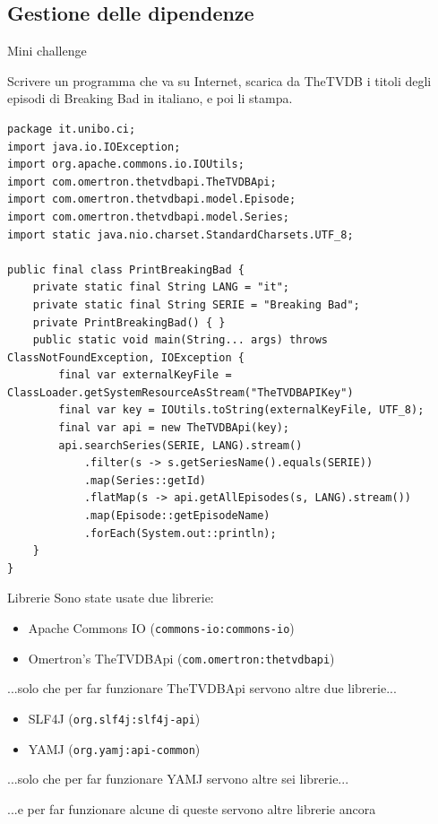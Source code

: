 \documentclass[presentation]{beamer}
\begin{document}
\subsection{Gestione delle dipendenze}

\begin{frame}[fragile]{Mini challenge}
\begin{block}{}
Scrivere un programma che va su Internet, scarica da TheTVDB i titoli degli episodi di Breaking Bad in italiano, e poi li stampa.
\end{block}

\pause
\begin{verbatim}
package it.unibo.ci;
import java.io.IOException;
import org.apache.commons.io.IOUtils;
import com.omertron.thetvdbapi.TheTVDBApi;
import com.omertron.thetvdbapi.model.Episode;
import com.omertron.thetvdbapi.model.Series;
import static java.nio.charset.StandardCharsets.UTF_8;

public final class PrintBreakingBad {
    private static final String LANG = "it";
    private static final String SERIE = "Breaking Bad";
    private PrintBreakingBad() { }
    public static void main(String... args) throws ClassNotFoundException, IOException {
        final var externalKeyFile = ClassLoader.getSystemResourceAsStream("TheTVDBAPIKey")
        final var key = IOUtils.toString(externalKeyFile, UTF_8);
        final var api = new TheTVDBApi(key);
        api.searchSeries(SERIE, LANG).stream()
            .filter(s -> s.getSeriesName().equals(SERIE))
            .map(Series::getId)
            .flatMap(s -> api.getAllEpisodes(s, LANG).stream())
            .map(Episode::getEpisodeName)
            .forEach(System.out::println);
    }
}
\end{verbatim}
\end{frame}

\begin{frame}{Librerie}
    Sono state usate due librerie:
    \begin{itemize}
        \item Apache Commons IO (\texttt{commons-io:commons-io})
        \item Omertron's TheTVDBApi (\texttt{com.omertron:thetvdbapi})
    \end{itemize}
    ...solo che per far funzionare TheTVDBApi servono altre due librerie...
    \begin{itemize}
        \item SLF4J (\texttt{org.slf4j:slf4j-api})
        \item YAMJ (\texttt{org.yamj:api-common})
    \end{itemize}
    ...solo che per far funzionare YAMJ servono altre sei librerie...

    ...e per far funzionare alcune di queste servono altre librerie ancora
\end{frame}
\end{document}
